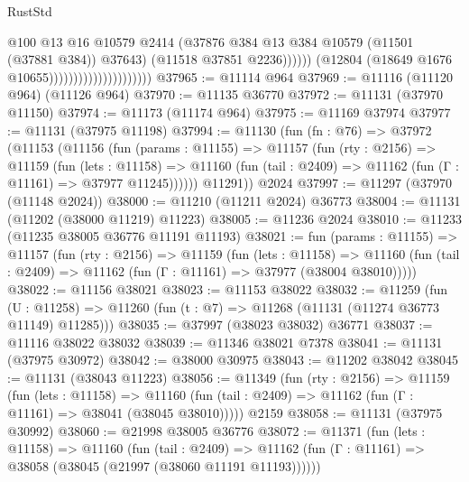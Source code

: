 \begin{lexlean}{RustStd}
\begin{coremodule}
                                                    @100
                                                    @13
                                                    @16
                                                    @10579
                                                    @2414
                                                    (@37876
                                                      @384
                                                      @13
                                                      @384
                                                      @10579
                                                      (@11501 (@37881 @384))
                                                      @37643)
                                                    (@11518 @37851 @2236))))))
                                          (@12804 (@18649 @1676 @10655)))))))))))))))))))))
@37965 := @11114 @964
@37969 := @11116 (@11120 @964) (@11126 @964)
@37970 := @11135 @36770
@37972 := @11131 (@37970 @11150)
@37974 := @11173 (@11174 @964)
@37975 := @11169 @37974
@37977 := @11131 (@37975 @11198)
@37994 := @11130
    (fun (fn : @76) =>
    @37972
      (@11153
        (@11156
          (fun (params : @11155) =>
          @11157
            (fun (rty : @2156) =>
            @11159
              (fun (lets : @11158) =>
              @11160 (fun (tail : @2409) => @11162 (fun (Γ : @11161) => @37977 @11245))))))
        @11291))
    @2024
@37997 := @11297 (@37970 (@11148 @2024))
@38000 := @11210 (@11211 @2024) @36773
@38004 := @11131 (@11202 (@38000 @11219) @11223)
@38005 := @11236 @2024
@38010 := @11233 (@11235 @38005 @36776 @11191 @11193)
@38021 := fun (params : @11155) =>
  @11157
    (fun (rty : @2156) =>
    @11159
      (fun (lets : @11158) =>
      @11160 (fun (tail : @2409) => @11162 (fun (Γ : @11161) => @37977 (@38004 @38010)))))
@38022 := @11156 @38021
@38023 := @11153 @38022
@38032 := @11259
    (fun (U : @11258) => @11260 (fun (t : @7) => @11268 (@11131 (@11274 @36773 @11149) @11285)))
@38035 := @37997 (@38023 @38032) @36771
@38037 := @11116 @38022 @38032
@38039 := @11346 @38021 @7378
@38041 := @11131 (@37975 @30972)
@38042 := @38000 @30975
@38043 := @11202 @38042
@38045 := @11131 (@38043 @11223)
@38056 := @11349
    (fun (rty : @2156) =>
    @11159
      (fun (lets : @11158) =>
      @11160 (fun (tail : @2409) => @11162 (fun (Γ : @11161) => @38041 (@38045 @38010)))))
    @2159
@38058 := @11131 (@37975 @30992)
@38060 := @21998 @38005 @36776
@38072 := @11371
    (fun (lets : @11158) =>
    @11160
      (fun (tail : @2409) =>
      @11162 (fun (Γ : @11161) => @38058 (@38045 (@21997 (@38060 @11191 @11193))))))

\end{coremodule}
\end{lexlean}
